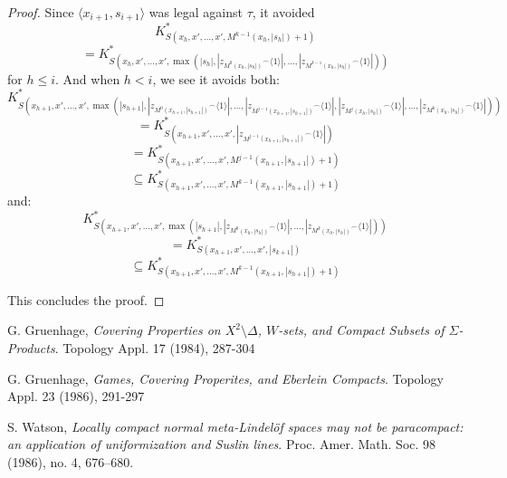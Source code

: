 \documentclass[11pt]{article}
\theoremstyle{plain}
\theoremstyle{definition}
\theoremstyle{remark}
\newcommand{\<}{\langle}
\renewcommand{\>}{\rangle}
\begin{document}
\begin{proof}
Since $\<x_{i+1},s_{i+1}\>$ was legal against $\tau$, it avoided
  \[
    K^*_{S(x_h,x',\dots,x',M^{k-1}(x_h,|s_h|)+1)} 
  \]
  \[
    = 
    K^*_{S(x_h,x',\dots,x',\max(|s_h|,|{z_{M^{0}(x_h,|s_h|)}}^\frown\<1\>|,\dots,|{z_{M^{k-1}(x_h,|s_h|)}}^\frown\<1\>|))}
  \]
for $h\leq i$. And when $h<i$, we see it avoids both:
  \[
    K^*_{S(x_{h+1},x',\dots,x',\max(|s_{h+1}|,|{z_{M^0(x_{h+1},|s_{h+1}|)}}^\frown\<1\>|,\dots,|{z_{M^{j-1}(x_{h+1},|s_{h+1}|)}}^\frown\<1\>|,|{z_{M^{j}(x_{h},|s_{h}|)}}^\frown\<1\>|,\dots,|{z_{M^{k}(x_{h},|s_{h}|)}}^\frown\<1\>|))} 
  \]
  \[
    =
    K^*_{S(x_{h+1},x',\dots,x',|{z_{M^{j-1}(x_{h+1},|s_{h+1}|)}}^\frown\<1\>|)}
  \]
  \[
    =
    K^*_{S(x_{h+1},x',\dots,x',M^{j-1}(x_{h+1},|s_{h+1}|)+1)}
  \]
  \[
    \subseteq
    K^*_{S(x_{h+1},x',\dots,x',M^{k-1}(x_{h+1},|s_{h+1}|)+1)}
  \]
and:
  \[
    K^*_{S(x_{h+1},x',\dots,x',\max(|s_{h+1}|,|{z_{M^0(x_{h},|s_{h}|)}}^\frown\<1\>|,\dots,|{z_{M^{k}(x_{h},|s_{h}|)}}^\frown\<1\>|))} 
  \]
  \[
    =
    K^*_{S(x_{h+1},x',\dots,x',|s_{k+1}|)}
  \]
  \[
    \subseteq
    K^*_{S(x_{h+1},x',\dots,x',M^{k-1}(x_{h+1},|s_{h+1}|)+1)}
  \]


This concludes the proof.
\end{proof}

\begin{thebibliography}{9}

  G. Gruenhage,
  \emph{Covering Properties on $X^2\setminus\Delta$, $W$-sets, and Compact Subsets of $\Sigma$-Products}.
  Topology Appl. 17 (1984), 287-304

  G. Gruenhage,
  \emph{Games, Covering Properites, and Eberlein Compacts}.
  Topology Appl. 23 (1986), 291-297

  S. Watson,
  \emph{Locally compact normal meta-Lindelöf spaces may not be paracompact: 
  an application of uniformization and Suslin lines}. 
  Proc. Amer. Math. Soc. 98 (1986), no. 4, 676–680.

\end{thebibliography}
\end{document}
